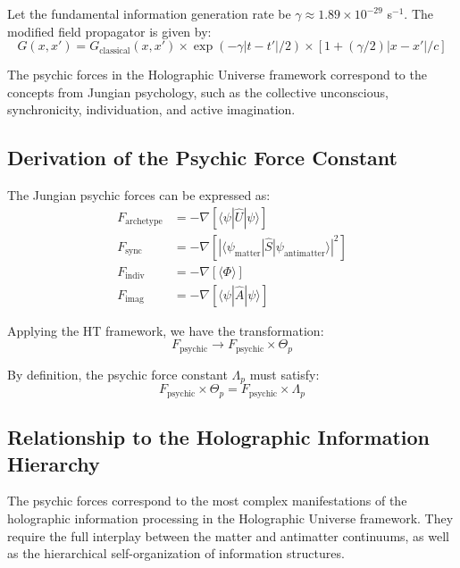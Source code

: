 \documentclass{article}
\theoremstyle{plain}
\theoremstyle{definition}
\theoremstyle{remark}
\begin{document}
Let the fundamental information generation rate be $\gamma \approx 1.89 \times 10^{-29}$ s$^{-1}$. The modified field propagator is given by:
\begin{equation}
G(x,x') = G_\text{classical}(x,x') \times \exp(-\gamma|t-t'|/2) \times \left[1 + (\gamma/2)|x-x'|/c\right]
\end{equation}

The psychic forces in the Holographic Universe framework correspond to the concepts from Jungian psychology, such as the collective unconscious, synchronicity, individuation, and active imagination.

\subsection{Derivation of the Psychic Force Constant}

The Jungian psychic forces can be expressed as:
\begin{align}
F_\text{archetype} &= -\nabla \left[\langle \psi | \hat{U} | \psi \rangle\right] \\
F_\text{sync} &= -\nabla \left[|\langle \psi_\text{matter} | \hat{S} | \psi_\text{antimatter} \rangle|^2\right] \\
F_\text{indiv} &= -\nabla \left[\langle \Phi \rangle\right] \\
F_\text{imag} &= -\nabla \left[\langle \psi | \hat{A} | \psi \rangle\right]
\end{align}

Applying the HT framework, we have the transformation:
\begin{equation}
F_\text{psychic} \rightarrow F_\text{psychic} \times \Theta_p
\end{equation}

By definition, the psychic force constant $\Lambda_p$ must satisfy:
\begin{equation}
F_\text{psychic} \times \Theta_p = F_\text{psychic} \times \Lambda_p
\end{equation}

\subsection{Relationship to the Holographic Information Hierarchy}

The psychic forces correspond to the most complex manifestations of the holographic information processing in the Holographic Universe framework. They require the full interplay between the matter and antimatter continuums, as well as the hierarchical self-organization of information structures.
\end{document}
